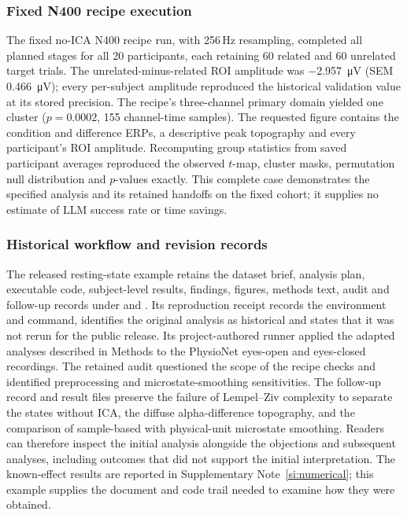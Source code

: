 \subsubsection*{Fixed N400 recipe execution}

The fixed no-ICA N400 recipe run, with 256\,Hz resampling, completed all planned stages for all 20 participants, each retaining 60 related and 60 unrelated target trials. The unrelated-minus-related ROI amplitude was \SI{-2.957}{\uV} (SEM \SI{0.466}{\uV}); every per-subject amplitude reproduced the historical validation value at its stored precision. The recipe's three-channel primary domain yielded one cluster ($p = 0.0002$, 155 channel-time samples). The requested figure contains the condition and difference ERPs, a descriptive peak topography and every participant's ROI amplitude. Recomputing group statistics from saved participant averages reproduced the observed $t$-map, cluster masks, permutation null distribution and $p$-values exactly. This complete case demonstrates the specified analysis and its retained handoffs on the fixed cohort; it supplies no estimate of LLM success rate or time savings.

\subsubsection*{Historical workflow and revision records}

The released resting-state example retains the dataset brief, analysis plan, executable code, subject-level results, findings, figures, methods text, audit and follow-up records under  and . Its reproduction receipt records the environment and command, identifies the original analysis as historical and states that it was not rerun for the public release. Its project-authored runner applied the adapted analyses described in Methods to the PhysioNet eyes-open and eyes-closed recordings. The retained audit questioned the scope of the recipe checks and identified preprocessing and microstate-smoothing sensitivities. The follow-up record and result files preserve the failure of Lempel--Ziv complexity to separate the states without ICA, the diffuse alpha-difference topography, and the comparison of sample-based with physical-unit microstate smoothing. Readers can therefore inspect the initial analysis alongside the objections and subsequent analyses, including outcomes that did not support the initial interpretation. The known-effect results are reported in Supplementary Note~\ref*{si:numerical}; this example supplies the document and code trail needed to examine how they were obtained.



